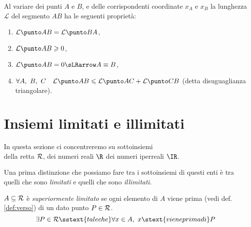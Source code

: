 Al variare dei punti \(A\) e \(B\), e delle corrispondenti coordinate 
\(x_A\) e \(x_B\) la lunghezza \(\mathcal{L}\) del segmento \(AB\) ha le 
seguenti proprietà:
\begin{enumerate}
\item \(\lung{A}{B} = \lung{B}{A}\), 
\item \(\lung{A}{B} \geqslant 0\),
\item \(\lung{A}{B} = 0 \sLRarrow A \equiv B\),
\item \(\forall A,~B,~C \quad \lung{A}{B} \leqslant \lung{A}{C} + 
\lung{C}{B}\) 
(detta disuguaglianza triangolare).
\end{enumerate}

\section{Insiemi limitati e illimitati}
\label{sec:topologiainsiemi}

In questa sezione ci concentreremo su sottoinsiemi \\
\hspace*{20mm}
della retta \(\mathcal{R}\), \qquad dei numeri reali \(\R\) \qquad 
dei numeri iperreali \(\IR\).

% 


Una prima distinzione che possiamo fare tra i sottoinsiemi di questi enti 
è tra quelli che sono \emph{limitati} e quelli che sono \emph{illimitati}.

\begin{newdef}{}{}
\(A \subseteq \mathcal{R}\) è \emph{superiormente limitato} se 
ogni elemento di \(A\) viene prima (vedi def. \ref{def:verso}) 
di un dato punto \(P \in \mathcal{R}\).
\[\exists P \in \retta \sstext{tale che} 
  \forall x \in A,~ x \stext{viene prima di} P\]
\end{newdef}

